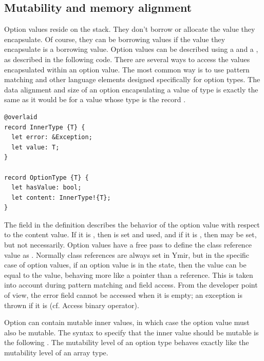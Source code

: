 \subsection{Mutability and memory alignment}

Option values reside on the stack. They don't borrow or allocate the value they
encapsulate. Of course, they can be borrowing values if the value they
encapsulate is a borrowing value. Option values can be described using a
 and a , as described in the following code.
There are several ways to access the values encapsulated within an option value.
The most common way is to use pattern matching and other language elements
designed specifically for option types. The data alignment and size of an option
encapsulating a value of type  is exactly the same as it would be for
a value whose type is the record .

\begin{lstlisting}[style=coloredverbatim]
@overlaid
record InnerType {T} {
  let error: &Exception;
  let value: T;
}

record OptionType {T} {
  let hasValue: bool;
  let content: InnerType!{T};
}
\end{lstlisting}

The  field in the  definition describes the
behavior of the option value with respect to the content value. If it is
, then  is set and used, and if it is
, then  may be set, but not necessarily.
Option values have a free pass to define the class reference value
 as . Normally class references are always
set in Ymir, but in the specific case of option values, if an option value is in
the  state, then the  value can be equal to
the  value, behaving more like a pointer than a reference. This is
taken into account during pattern matching and field access. From the developer
point of view, the error field cannot be accessed when it is empty; an exception
is thrown if it is (cf. Access binary operator).

Option can contain mutable inner values, in which case the option value must
also be mutable. The syntax to specify that the inner value should be mutable is
the following . The mutability level of an option type
behaves exactly like the mutability level of an array type.


